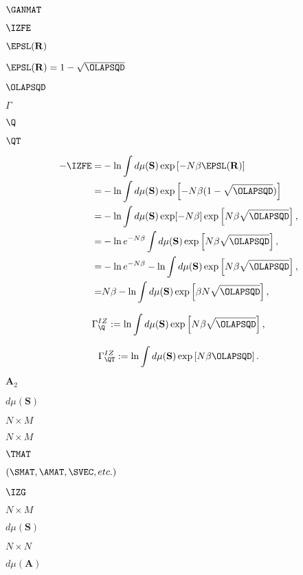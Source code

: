 $\GANMAT$

$\IZFE$

$\EPSL(\mathbf{R})$

$\EPSL(\mathbf{R}) = 1 - \sqrt{\OLAPSQD}$

$\OLAPSQD$

$\Gamma$

$\Q$

$\QT$

\begin{align}
  \label{eqn:IZFE0}
-\IZFE =& -  \ln \int d\mu(\mathbf{S}) \exp\left[-N\beta \EPSL(\mathbf{R})  \right] \\ 
=& - \ln \int d\mu(\mathbf{S}) \exp\left[-N\beta(1 - \sqrt{\OLAPSQD} ) \right] \\ 
\label{eqn:IZFE1}
=& -  \ln \int d\mu(\mathbf{S}) \exp[-N\beta]\exp\left[N\beta \sqrt{\OLAPSQD}\right], \\
\label{eqn:IZFE2}
=& -  \ln e^{-N\beta} \int d\mu(\mathbf{S}) \exp\left[N\beta \sqrt{\OLAPSQD}\right], \\
\label{eqn:IZFE3}
=& -  \ln e^{-N\beta} - \ln \int d\mu(\mathbf{S}) \exp\left[N\beta \sqrt{\OLAPSQD}\right], \\
\label{eqn:IZFE4}
=& N\beta - \ln \int d\mu(\mathbf{S}) \exp\left[\beta N\sqrt{\OLAPSQD}\right], 
\end{align}

\begin{align}
  \label{eqn:IZG_Q}
  \Gamma^{IZ}_{\Q} :=  \ln \int d\mu(\mathbf{S}) \exp\left[N\beta \sqrt{{\OLAPSQD}}\right],
\end{align}

\begin{align}
    \label{eqn:IZG_QT}
  \Gamma^{IZ}_{\QT} :=  \ln \int d\mu(\mathbf{S}) \exp\left[N\beta {\OLAPSQD}\right]  .
\end{align}


$\mathbf{A}_{2}$

$d\mu(\mathbf{S})$

$N \times M$

$N \times M$

$\TMAT$

$(\SMAT, \AMAT, \SVEC, etc.)$

$\IZG$

$N \times M$

$d\mu(\mathbf{S})$

$N \times N$

$d\mu(\mathbf{A})$


